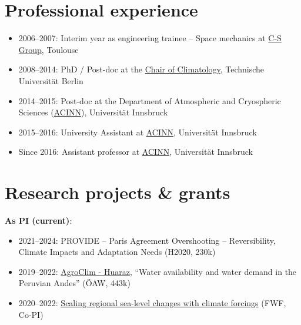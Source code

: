 \section*{Professional experience}
\label{\detokenize{ch08/cv:professional-experience}}\begin{itemize}
\item {} 
2006--2007: Interim year as engineering trainee -- Space mechanics at \href{https://www.c-s.fr}{C-S Group}, Toulouse

\item {} 
2008--2014: PhD / Post-doc at the \href{http://klima.tu-berlin.de}{Chair of Climatology}, Technische Universität Berlin

\item {} 
2014--2015: Post-doc at the Department of Atmospheric and Cryospheric Sciences (\href{https://www.uibk.ac.at/acinn}{ACINN}), Universität Innsbruck

\item {} 
2015--2016: University Assistant at \href{https://www.uibk.ac.at/acinn}{ACINN}, Universität Innsbruck

\item {} 
Since 2016: Assistant professor at \href{https://www.uibk.ac.at/acinn}{ACINN}, Universität Innsbruck

\end{itemize}


\section*{Research projects \& grants}
\label{\detokenize{ch08/cv:research-projects-grants}}
\textbf{As PI (current)}:
\begin{itemize}[nosep]
\item {} 
2021--2024: PROVIDE -- Paris Agreement Overshooting -- Reversibility, Climate Impacts and Adaptation Needs (H2020, 230k\texteuro{})

\item {} 
2019--2022: \href{https://agroclim-huaraz.info/}{AgroClim - Huaraz}, “Water availability and water demand in the Peruvian Andes” (ÖAW, 443k\texteuro{})

\item {} 
2020--2022: \href{https://www.uibk.ac.at/acinn/research/ice-and-climate/projects/scaling\_regional\_sea\_level\_changes.html.en}{Scaling regional sea-level changes with climate forcings} (FWF, Co-PI)

\end{itemize}


